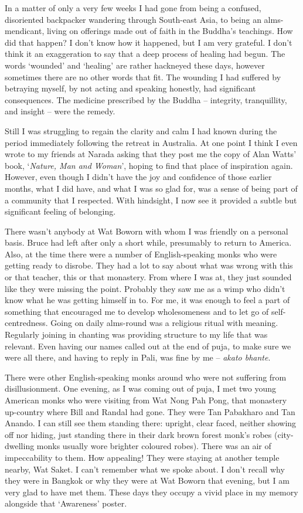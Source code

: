 In a matter of only a very few weeks I had gone from being a confused,
disoriented backpacker wandering through South-east Asia, to being an
alms-mendicant, living on offerings made out of faith in the Buddha's
teachings. How did that happen? I don't know how it happened, but I am
very grateful. I don't think it an exaggeration to say that a deep
process of healing had begun. The words `wounded' and `healing' are
rather hackneyed these days, however sometimes there are no other words
that fit. The wounding I had suffered by betraying myself, by not acting
and speaking honestly, had significant consequences. The medicine
prescribed by the Buddha -- integrity, tranquillity, and insight -- were
the remedy.

Still I was struggling to regain the clarity and calm I had known during
the period immediately following the retreat in Australia. At one point
I think I even wrote to my friends at Narada asking that they post me
the copy of Alan Watts' book, `\emph{Nature, Man and Woman}', hoping to
find that place of inspiration again. However, even though I didn't have
the joy and confidence of those earlier months, what I did have, and
what I was so glad for, was a sense of being part of a community that I
respected. With hindsight, I now see it provided a subtle but
significant feeling of belonging.

There wasn't anybody at Wat Boworn with whom I was friendly on a
personal basis. Bruce had left after only a short while, presumably to
return to America. Also, at the time there were a number of
English-speaking monks who were getting ready to disrobe. They had a lot
to say about what was wrong with this or that teacher, this or that
monastery. From where I was at, they just sounded like they were missing
the point. Probably they saw me as a wimp who didn't know what he was
getting himself in to. For me, it was enough to feel a part of something
that encouraged me to develop wholesomeness and to let go of
self-centredness. Going on daily alms-round was a religious ritual with
meaning. Regularly joining in chanting was providing structure to my
life that was relevant. Even having our names called out at the end of
puja\emph{,} to make sure we were all there, and having to reply in
Pali, was fine by me -- \emph{akato bhante}.

There were other English-speaking monks around who were not suffering
from disillusionment. One evening, as I was coming out of puja, I met
two young American monks who were visiting from Wat Nong Pah Pong, that
monastery up-country where Bill and Randal had gone. They were Tan
Pabakharo and Tan Anando. I can still see them standing there: upright,
clear faced, neither showing off nor hiding, just standing there in
their dark brown forest monk's robes (city-dwelling monks usually wore
brighter coloured robes). There was an air of impeccability to them. How
appealing! They were staying at another temple nearby, Wat Saket. I
can't remember what we spoke about. I don't recall why they were in
Bangkok or why they were at Wat Boworn that evening, but I am very glad
to have met them. These days they occupy a vivid place in my memory
alongside that `Awareness' poster.

